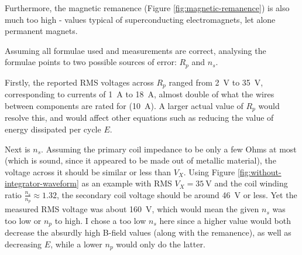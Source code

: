 \documentclass[a4paper]{scrartcl}
\begin{document}
Furthermore, the magnetic remanence (Figure \ref{fig:magnetic-remanence}) is also much too high - values typical of superconducting electromagnets, let alone permanent magnets.

Assuming all formulae used and measurements are correct, analysing the formulae points to two possible sources of error: \(R_p\) and \(n_s\).

Firstly, the reported RMS voltages across \(R_p\) ranged from \SI{2}{\volt} to \SI{35}{\volt}, corresponding to currents of \SI{1}{\ampere} to \SI{18}{\ampere}, almost double of what the wires between components are rated for (\SI{10}{\ampere}). A larger actual value of \(R_p\) would resolve this, and would affect other equations such as reducing the value of energy dissipated per cycle \(E\).

Next is \(n_s\). Assuming the primary coil impedance to be only a few Ohms at most (which is sound, since it appeared to be made out of metallic material), the voltage across it should be similar or less than \(V_X\). Using Figure \ref{fig:without-integrator-waveform} as an example with RMS \(V_X = \SI{35}{\volt}\) and the coil winding ratio \(\frac{n_s}{n_p} \approx 1.32\), the secondary coil voltage should be around \SI{46}{\volt} or less. Yet the measured RMS voltage was about \SI{160}{\volt}, which would mean the given \(n_s\) was too low or \(n_p\) to high. I chose a too low \(n_s\) here since a higher value would both decrease the absurdly high B-field values (along with the remanence), as well as decreasing \(E\), while a lower \(n_p\) would only do the latter.
\end{document}
